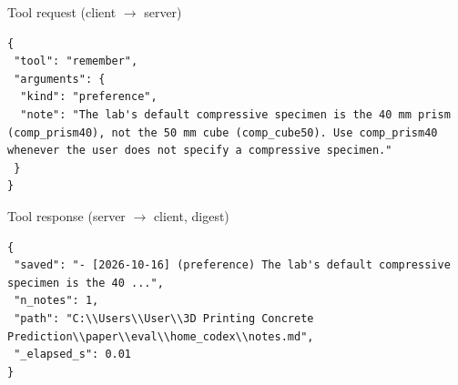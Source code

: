 \begin{mcpbox}{Tool request (client $\rightarrow$ server)}
\begin{lstlisting}[style=jsonstyle]
{
 "tool": "remember",
 "arguments": {
  "kind": "preference",
  "note": "The lab's default compressive specimen is the 40 mm prism (comp_prism40), not the 50 mm cube (comp_cube50). Use comp_prism40 whenever the user does not specify a compressive specimen."
 }
}
\end{lstlisting}
\end{mcpbox}
\begin{mcpbox}{Tool response (server $\rightarrow$ client, digest)}
\begin{lstlisting}[style=jsonstyle]
{
 "saved": "- [2026-10-16] (preference) The lab's default compressive specimen is the 40 ...",
 "n_notes": 1,
 "path": "C:\\Users\\User\\3D Printing Concrete Prediction\\paper\\eval\\home_codex\\notes.md",
 "_elapsed_s": 0.01
}
\end{lstlisting}
\end{mcpbox}